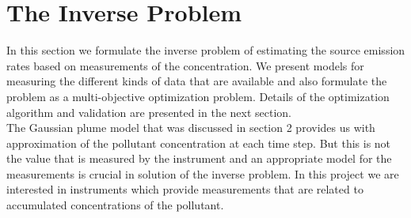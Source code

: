 \section{The Inverse Problem}
In this section we formulate the inverse problem of estimating 
the source emission rates based on measurements of the 
concentration. We present models for measuring the different 
kinds of data that are available and also formulate the problem 
as a multi-objective optimization problem. Details of the
optimization algorithm and validation are presented in the 
next section. \\

The Gaussian plume model that was discussed in section 2 provides 
us with approximation of the pollutant concentration at each 
time step. But this is not the value that is measured by the 
instrument and an appropriate model for the measurements is crucial in 
solution of the inverse problem. In this project we are interested in 
instruments which provide measurements that are related to accumulated 
concentrations of the pollutant.